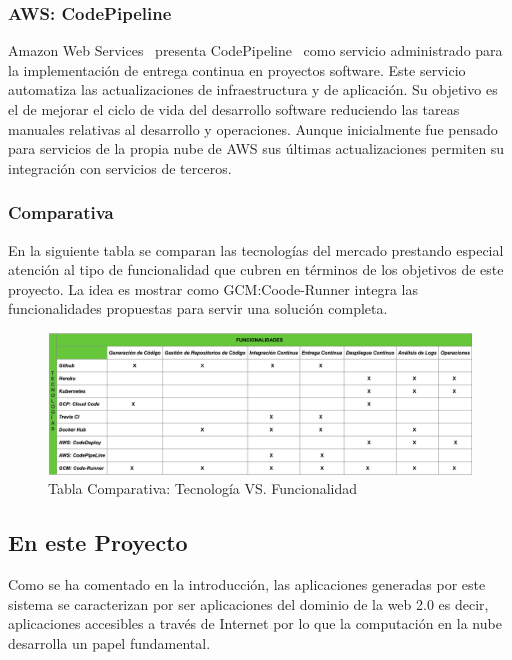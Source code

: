 \documentclass[a4paper,11pt]{book}
\begin{document}
\subsubsection{AWS: CodePipeline}
Amazon Web Services~\cite{aws} presenta  CodePipeline~\cite{awspipe} como servicio administrado para la implementación de entrega continua en proyectos software. Este servicio automatiza las actualizaciones de infraestructura y de aplicación. Su objetivo es el de mejorar el ciclo de vida del desarrollo software reduciendo las tareas manuales relativas al desarrollo y operaciones. Aunque inicialmente fue pensado para servicios de la propia nube de AWS sus últimas actualizaciones permiten su integración con servicios de terceros.  


\subsubsection{Comparativa}

En la siguiente tabla se comparan las tecnologías del mercado prestando especial atención al tipo de funcionalidad que cubren en términos de los objetivos de este proyecto. La idea es mostrar como GCM:Coode-Runner integra las funcionalidades propuestas para servir una solución completa.

\begin{figure}[H]
\centering
\includegraphics[scale=0.30]{imagenes/comparativa.png}
\caption{ Tabla Comparativa: Tecnología VS. Funcionalidad }
\end{figure}


\subsection{En este Proyecto}

Como se ha comentado en la introducción, las aplicaciones generadas por este sistema se caracterizan por ser aplicaciones del dominio de la web 2.0 es decir, aplicaciones accesibles a través de Internet por lo que la computación en la nube desarrolla un papel fundamental. 
\end{document}
